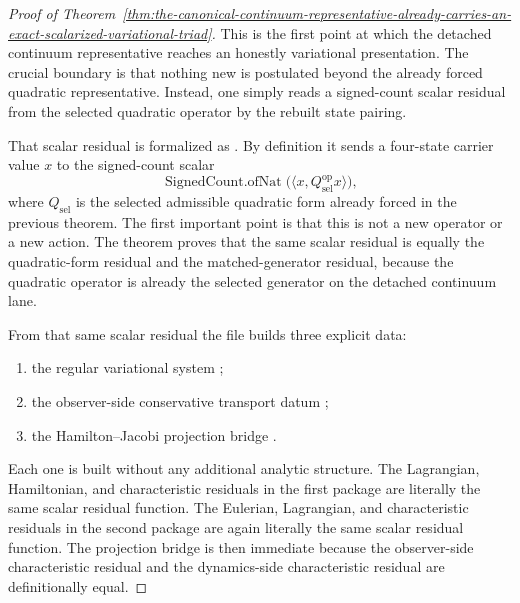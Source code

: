 \begin{proof}[Proof of Theorem~\ref{thm:the-canonical-continuum-representative-already-carries-an-exact-scalarized-variational-triad}]
\label{proof:thm:the-canonical-continuum-representative-already-carries-an-exact-scalarized-variational-triad}
This is the first point at which the detached continuum representative reaches
an honestly variational presentation. The crucial boundary is that nothing new
is postulated beyond the already forced quadratic representative. Instead, one
simply reads a signed-count scalar residual from the selected quadratic
operator by the rebuilt state pairing.

That scalar residual is formalized as
. By definition it sends a four-state
carrier value \(x\) to the signed-count scalar
\[
\operatorname{SignedCount.ofNat}\!\bigl(\langle x,Q_{\mathrm{sel}}^{\mathrm{op}}x\rangle\bigr),
\]
where \(Q_{\mathrm{sel}}\) is the selected admissible quadratic form already
forced in the previous theorem. The first important point is that this is not
a new operator or a new action. The theorem
proves that the same scalar residual is equally the quadratic-form residual
and the matched-generator residual, because the quadratic operator is already
the selected generator on the detached continuum lane.

From that same scalar residual the file builds three explicit data:
\begin{enumerate}
\item the regular variational system
      ;
\item the observer-side conservative transport datum
      ;
\item the Hamilton--Jacobi projection bridge
      .
\end{enumerate}
Each one is built without any additional analytic structure. The Lagrangian,
Hamiltonian, and characteristic residuals in the first package are literally
the same scalar residual function. The Eulerian, Lagrangian, and
characteristic residuals in the second package are again literally the same
scalar residual function. The projection bridge is then immediate because the
observer-side characteristic residual and the dynamics-side characteristic
residual are definitionally equal.


\end{proof}

